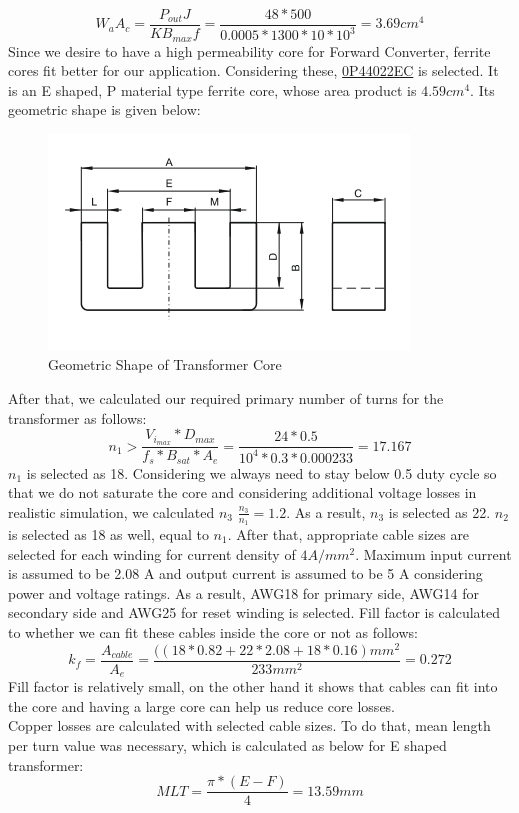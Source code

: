 \documentclass{article}
\newcommand\tab[1][1cm]{\hspace*{#1}}
\begin{document}
 \begin{equation*}
     W_aA_c=\frac{P_{out}J}{K B_{max} f}=\frac{48*500}{0.0005*1300*10*10^3}=3.69 cm^4
 \end{equation*}
 \tab Since we desire to have a high permeability core for Forward Converter, ferrite cores fit better for our application. Considering these, \href{https://www.mag-inc.com/Media/Magnetics/Datasheets/0P44022EC.pdf}{0P44022EC} is selected. It is an E shaped, P material type ferrite core, whose area product is $4.59 cm^4$. Its geometric shape is given below:
 \begin{figure}[H]
    \centering
    \includegraphics[scale=0.5]{transformer.PNG}
    \caption{Geometric Shape of Transformer Core}
    \label{fig:my_label}
\end{figure}
 \tab After that, we calculated our required primary number of turns for the transformer as follows:
 \begin{equation*}
    n_1>\frac{V_i_{max}*D_{max}}{f_s*B_{sat}*A_e}=\frac{24*0.5}{10^4*0.3*0.000233}=17.167
\end{equation*}
$n_1$ is selected as 18. Considering we always need to stay below 0.5 duty cycle so that we do not saturate the core and considering additional voltage losses in realistic simulation, we calculated $n_3$ $ \frac{n_3}{n_1}=1.2$. As a result, $n_3$ is selected as 22. $n_2$ is selected as 18 as well, equal to $n_1$. After that, appropriate cable sizes are selected for each winding for current density of $4 A/mm^2$. Maximum input current is assumed to be 2.08 A and output current is assumed to be 5 A considering power and voltage ratings. As a result, AWG18 for primary side, AWG14 for secondary side and AWG25 for reset winding is selected. Fill factor is calculated to whether we can fit these cables inside the core or not as follows:
\begin{equation*}
    k_f=\frac{A_{cable}}{A_e}=\frac{((18*0.82+22*2.08+18*0.16) mm^2}{233 mm^2}=0.272
\end{equation*}
Fill factor is relatively small, on the other hand it shows that cables can fit into the core and having a large core can help us reduce core losses. \\
\tab Copper losses are calculated with selected cable sizes. To do that, mean length per turn value was necessary, which is calculated as below for E shaped transformer:
\begin{equation*}
    MLT=\frac{ \pi*(E-F)}{4}= 13.59 mm
\end{equation*}
\end{document}
